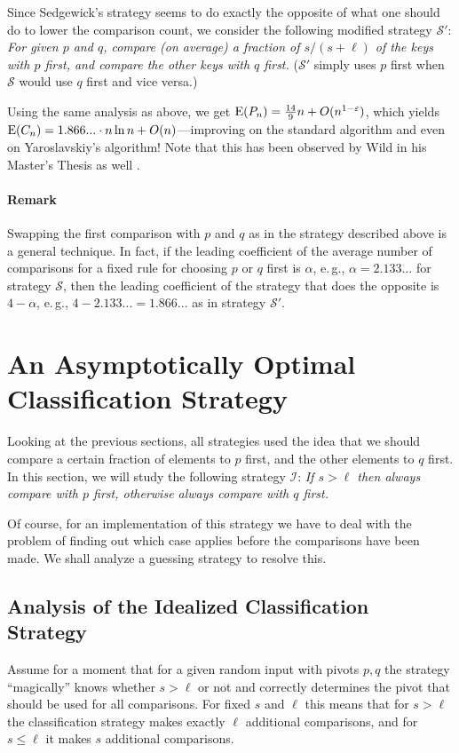 \documentclass[prodmode,acmtalg]{acmsmall}
\newcommand{\E}{\textnormal{\textrm{E}}}
\begin{document}
Since Sedgewick's strategy seems to do exactly the opposite of what one should
do to lower the comparison count, we consider
the following modified 
strategy $\mathcal{S}'$: \emph{For given $p$
and $q$, compare (on average) a fraction of
$s/(s+\ell)$ of the keys with $p$ first, and compare the other keys with
$q$ first.} ($\mathcal{S}'$ simply uses $p$ first when $\mathcal{S}$ would use
$q$ first and vice versa.)

Using the same analysis as above, we get $\E(P_n) =
\frac{14}{9} n
+ O(n^{1 - \varepsilon})$, which yields $\E(C_n) = 1.866...\cdot n
\ln n + O(n)$---improving on the standard algorithm and even on
Yaroslavskiy's algorithm! Note that this has been observed by Wild in his Master's Thesis as well \cite{Wild2013}.

\paragraph{Remark} Swapping the first comparison with $p$ and $q$ as in the strategy described above is a
general technique. In fact, if the
leading coefficient of the average number of comparisons for a fixed rule 
for choosing $p$ or $q$ first is $\alpha$, e.\,g., $\alpha = 2.133...$ for strategy
$\mathcal{S}$,  then the leading coefficient of the strategy that
does the opposite is $4 - \alpha$, e.\,g., $4 - 2.133... = 1.866...$ as in
strategy $\mathcal{S}'$.



\section{An Asymptotically Optimal Classification Strategy}\label{sec:decreasing}
Looking at the previous sections, all strategies used the idea that we should
compare a certain fraction of elements to $p$ first, and the other
elements to $q$ first. In this section, we
will study the following strategy $\mathcal{I}$: \emph{If $s >
\ell$ then always compare with $p$ first, otherwise always compare with $q$
first.} 

Of course, for an implementation of this strategy we have to deal with the
problem of finding out which case applies before the comparisons have been made.
We shall analyze a guessing strategy to resolve this. 

    \subsection{Analysis of the Idealized Classification Strategy}\label{sec:optimal:strategy}
 Assume for a moment that for a given random input with pivots $p,q$ the
 strategy ``magically'' knows whether
 $s > \ell$ or not and correctly determines the pivot that should be used for all
 comparisons. For fixed $s$ and $\ell$ this means that for $s > \ell$ the
 classification strategy makes exactly $\ell$ additional comparisons, and for $s \leq \ell$ it
 makes $s$ additional comparisons.
\end{document}
